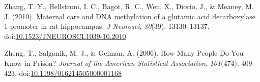 \documentclass[jou]{apa6}
\theoremstyle{definition}
\theoremstyle{definition}
\theoremstyle{definition}
\theoremstyle{remark}
\begin{document}
\hypertarget{ref-Zhang2010}{}
Zhang, T. Y., Hellstrom, I. C., Bagot, R. C., Wen, X., Diorio, J., \&
Meaney, M. J. (2010). Maternal care and DNA methylation of a glutamic
acid decarboxylase 1 promoter in rat hippocampus. \emph{J Neurosci},
\emph{30}(39), 13130--13137.
doi:\href{https://doi.org/10.1523/JNEUROSCI.1039-10.2010}{10.1523/JNEUROSCI.1039-10.2010}

\hypertarget{ref-Zheng2006}{}
Zheng, T., Salganik, M. J., \& Gelman, A. (2006). How Many People Do You
Know in Prison? \emph{Journal of the American Statistical Association},
\emph{101}(474), 409--423.
doi:\href{https://doi.org/10.1198/016214505000001168}{10.1198/016214505000001168}

\endgroup
\end{document}
